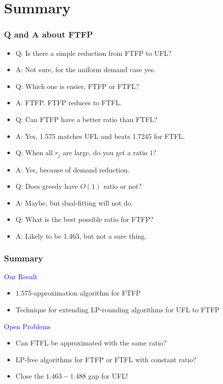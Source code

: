 \documentclass[hyperref,dvipsnames,svgnames,compress]{beamer}
\begin{document}
\section[Summary]{Summary}
\begin{frame}
  \frametitle{Q and A about FTFP}
  \begin{itemize}
  \item \color{red}
    Q: Is there a simple reduction from FTFP to UFL?
  \item<2,8> \color{blue}
    A: Not sure, for the uniform demand case yes.
  \item \color{red}
    Q: Which one is easier, FTFP or FTFL?
  \item<3,8> \color{blue}
    A: FTFP. FTFP reduces to FTFL.
  \item \color{red}
    Q: Can FTFP have a better ratio than FTFL?
  \item<4,8> \color{blue}
    A: Yes, 1.575 matches UFL and beats 1.7245 for FTFL.
  \item \color{red}
    Q: When all $r_j$ are large, do you get a ratio $1$?
  \item<5,8> \color{blue}
    A: Yes, because of demand reduction.
  \item \color{red}
    Q: Does greedy have $O(1)$ ratio or not?
  \item<6,8> \color{blue}
    A: Maybe, but dual-fitting will not do.
  \item \color{red}
    Q: What is the best possible ratio for FTFP?
  \item<7,8> \color{blue}
    A: Likely to be 1.463, but not a sure thing.
 \end{itemize}
\end{frame}

\begin{frame}
  \frametitle{Summary}
  
{\large
  {\textcolor{blue}{Our Result}}

  \begin{itemize}
  	\item $1.575$-approximation algorithm for FTFP
	\item Technique for extending LP-rounding algorithms for UFL to FTFP
  \end{itemize}

\vspace{0.2in}
\pause
  {\textcolor{blue}{Open Problems}}

  \begin{itemize}
  \item Can FTFL be approximated with the same ratio?
  \item LP-free algorithms for FTFP or FTFL with constant ratio?
  \item Close the $1.463-1.488$ gap for UFL!
  \end{itemize}
}

\end{frame}
\end{document}

